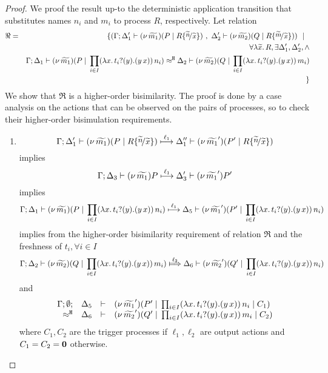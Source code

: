 \begin{proof}
	We proof the result up-to the deterministic application
	transition that substitutes names $n_i$ and $m_i$ to
	process $R$, respectively.
	Let relation
	\begin{eqnarray*}
		\Re	&=&	\set{	(\horel{\Gamma}{\Delta_1'}{\newsp{\widetilde{m_1}}{P \Par R \subst{\widetilde{n}}{\widetilde{x}} }}
						{\ ,\ }
						{\Delta_2'}{\newsp{\widetilde{m_2}}{Q \Par R \subst{\widetilde{m}}{\widetilde{x}} }})
					\setbar\\
					&& \forall \abs{\widetilde{x}}{R}, \exists \Delta_1', \Delta_2', \land \\
					&&	\horel{\Gamma}{\Delta_1}{\newsp{\widetilde{m_1}}{P \Par \prod_{i \in I} \appl{(\trvalx{t_i})}{n_i} }}
						{\hwb}
						{\Delta_2}{\newsp{\widetilde{m_2}}{Q \Par \prod_{i \in I} \appl{(\trvalx{t_i})}{m_i}}}\\
				&&}
	\end{eqnarray*}
	We show that $\Re$ is a higher-order bisimilarity.
	The proof is done by a case analysis on the actions that can be observed
	on the pairs of processes, so to check their higher-order bisimulation requirements.

	\begin{enumerate}
		\item	\[
					\horel{\Gamma}{\Delta_1'}{\newsp{\widetilde{m_1}}{P \Par R \subst{\widetilde{n}}{\widetilde{x}} }}
					{\hby{\ell_1}}
					{\Delta_1''}{\newsp{\widetilde{m_1}'}{P' \Par R \subst{\widetilde{n}}{\widetilde{x}} }}
				\]
				implies
				\[
					\Gamma; \Delta_3 \vdash (\nu\, \widetilde{m_1}){P} \stackrel{\ell_1}{\longmapsto} \Delta_3' \vdash (\nu\, \widetilde{m_1}'){P'}
				\]
				implies
				\[
					\Gamma; \Delta_1 \vdash (\nu\, \widetilde{m_1})(P \;|\; \prod_{i \in I} (\lambda x.\,t_i ? (y) . (y\, {x}))\, {n_i} ) \stackrel{\ell_1}{\longmapsto} \Delta_5 \vdash (\nu\, \widetilde{m_1}')(P' \;|\; \prod_{i \in I} (\lambda x.\,t_i ? (y) . (y\, {x}))\, {n_i} )
				\]
				implies from the higher-order bisimilarity requirement of relation $\Re$ and the
				freshness of $t_i, \forall i \in I$
				\[
					\horel{\Gamma}{\Delta_2}{\newsp{\widetilde{m_2}}{Q \Par \prod_{i \in I} \appl{(\trvalx{t_i})}{m_i} }}
					{\Hby{\ell_2}}
					{\Delta_6}{\newsp{\widetilde{m_2}'}{Q' \Par \prod_{i \in I} \appl{(\trvalx{t_i})}{n_i} }}
				\]
				and
				\begin{eqnarray}
					\begin{array}{rcll} \Gamma; \emptyset; &\Delta_5& \vdash& (\nu\, \widetilde{m_1}')(P' \;|\; \prod_{i \in I} (\lambda x.\,t_i ? (y) . (y\, {x}))\, {n_i} \;|\; C_1)\\ \approx^\mathtt{H} &\Delta_6& \vdash &  (\nu\, \widetilde{m_2}')(Q' \;|\; \prod_{i \in I} (\lambda x.\,t_i ? (y) . (y\, {x}))\, {m_i} \;|\; C_2) \end{array}
					\label{lem:trig_subst1}
				\end{eqnarray}
				where $C_1, C_2$ are the trigger processes if $\ell_1, \ell_2$ are output actions
				and $C_1 = C_2 = \mathbf{0}$ otherwise.


\end{enumerate}
\end{proof}
